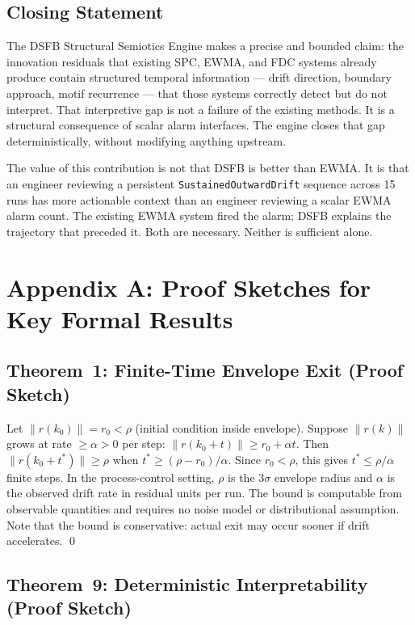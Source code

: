 \documentclass[11pt,letterpaper]{article}
\theoremstyle{scresult}
\begin{document}
\subsection{Closing Statement}

The DSFB Structural Semiotics Engine makes a precise and bounded claim: the
innovation residuals that existing SPC, EWMA, and FDC systems already produce
contain structured temporal information --- drift direction, boundary approach,
motif recurrence --- that those systems correctly detect but do not interpret.
That interpretive gap is not a failure of the existing methods. It is a
structural consequence of scalar alarm interfaces. The engine closes that gap
deterministically, without modifying anything upstream.

The value of this contribution is not that DSFB is better than EWMA. It is
that an engineer reviewing a persistent \texttt{SustainedOutwardDrift}
sequence across 15 runs has more actionable context than an engineer reviewing
a scalar EWMA alarm count. The existing EWMA system fired the alarm; DSFB
explains the trajectory that preceded it. Both are necessary. Neither is
sufficient alone.


\clearpage
\appendix
\section{Appendix A: Proof Sketches for Key Formal Results}
\label{app:proofs}

\subsection*{Theorem~1: Finite-Time Envelope Exit (Proof Sketch)}

Let $\|r(k_0)\| = r_0 < \rho$ (initial condition inside envelope). Suppose
$\|r(k)\|$ grows at rate $\geq \alpha > 0$ per step:
$\|r(k_0 + t)\| \geq r_0 + \alpha t$. Then $\|r(k_0 + t^*)\| \geq \rho$ when
$t^* \geq (\rho - r_0)/\alpha$. Since $r_0 < \rho$, this gives $t^* \leq
\rho/\alpha$ finite steps. In the process-control setting, $\rho$ is the
$3\sigma$ envelope radius and $\alpha$ is the observed drift rate in residual
units per run. The bound is computable from observable quantities and requires
no noise model or distributional assumption. Note that the bound is
conservative: actual exit may occur sooner if drift accelerates. \qed

\subsection*{Theorem~9: Deterministic Interpretability (Proof Sketch)}
\end{document}
